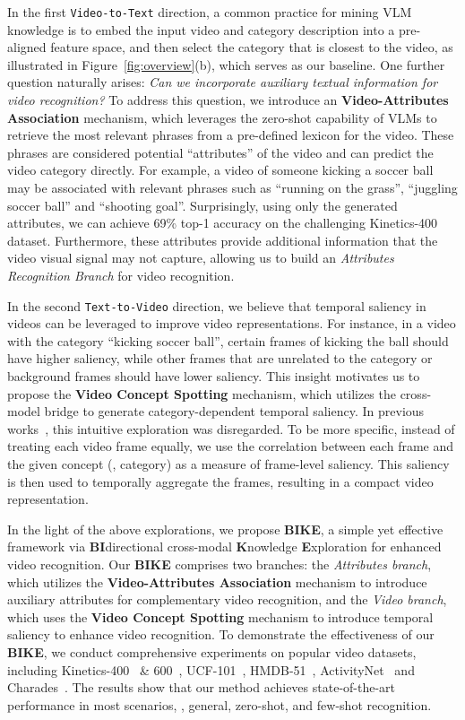 \documentclass[10pt,twocolumn,letterpaper]{article}
\begin{document}
In the first \texttt{Video-to-Text} direction, a common practice for mining VLM knowledge is to embed the input video and category description into a pre-aligned feature space, and then select the category that is closest to the video, as illustrated in Figure~\ref{fig:overview}(b), which serves as our baseline.
One further question naturally arises: \emph{Can we incorporate auxiliary textual information for video recognition?} To address this question, we introduce an \textbf{Video-Attributes Association} mechanism, which leverages the zero-shot capability of VLMs to retrieve the most relevant phrases from a pre-defined lexicon for the video. These phrases are considered potential ``attributes'' of the video and can predict the video category directly. For example, a video of someone kicking a soccer ball may be associated with relevant phrases such as ``running on the grass'', ``juggling soccer ball'' and ``shooting goal''. 
Surprisingly, using only the generated attributes, we can achieve 69\% top-1 accuracy on the challenging Kinetics-400 dataset.
Furthermore, these attributes provide additional information that the video visual signal may not capture, allowing us to build an \emph{Attributes Recognition Branch} for video recognition.



In the second \texttt{Text-to-Video} direction, we believe that temporal saliency in videos can be leveraged to improve video representations. For instance, in a video with the category ``kicking soccer ball'', certain frames of kicking the ball should have higher saliency, while other frames that are unrelated to the category or background frames should have lower saliency. 
This insight motivates us to propose the \textbf{Video Concept Spotting} mechanism, which utilizes the cross-model bridge to generate category-dependent temporal saliency. In previous works~\cite{wang2021actionclip,x-clip,text4vis}, this intuitive exploration was disregarded.
To be more specific, instead of treating each video frame equally, we use the correlation between each frame and the given concept (\eg, category) as a measure of frame-level saliency. This saliency is then used to temporally aggregate the frames, resulting in a compact video representation.

In the light of the above explorations, we propose \textbf{BIKE}, a simple yet effective framework via \textbf{BI}directional cross-modal \textbf{K}nowledge \textbf{E}xploration for enhanced video recognition. Our \textbf{BIKE} comprises two branches: the \emph{Attributes branch}, which utilizes the \textbf{Video-Attributes Association} mechanism to introduce auxiliary attributes for complementary video recognition, and the \emph{Video branch}, which uses the \textbf{Video Concept Spotting} mechanism to introduce temporal saliency to enhance video recognition.
To demonstrate the effectiveness of our \textbf{BIKE}, we conduct comprehensive experiments on popular video datasets, including Kinetics-400~\cite{kay2017kinetics} \& 600~\cite{k600}, UCF-101~\cite{ucf101}, HMDB-51~\cite{hmdb}, ActivityNet~\cite{caba2015activitynet} and Charades~\cite{charades}. The results show that our method achieves state-of-the-art performance in most scenarios, \eg, general, zero-shot, and few-shot recognition. 
\end{document}
